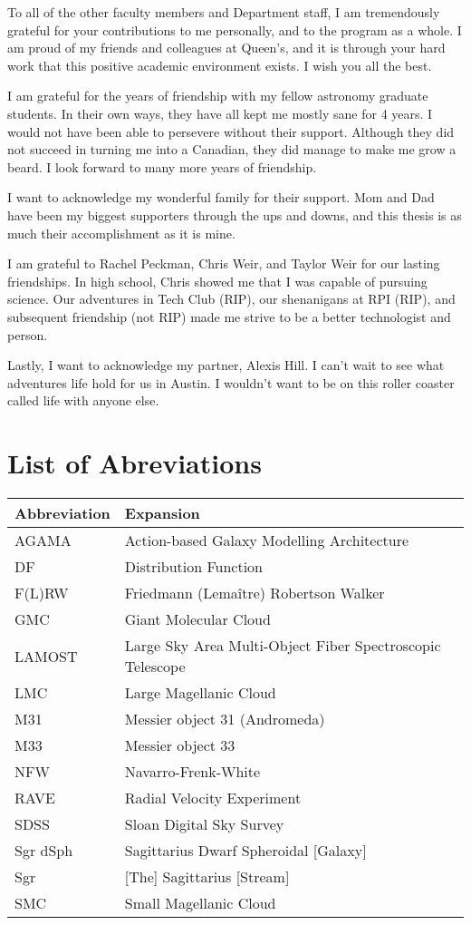 To all of the other faculty members and Department staff, I am tremendously grateful for your contributions to me personally, and to the program as a whole. I am proud of my friends and colleagues at Queen's, and it is through your hard work that this positive academic environment exists. I wish you all the best.

I am grateful for the years of friendship with my fellow astronomy graduate students. In their own ways, they have all kept me mostly sane for 4 years. I would not have been able to persevere without their support. Although they did not succeed in turning me into a Canadian, they did manage to make me grow a beard. I look forward to many more years of friendship.

I want to acknowledge my wonderful family for their support. Mom and Dad have been my biggest supporters through the ups and downs, and this thesis is as much their accomplishment as it is mine. 

I am grateful to Rachel Peckman, Chris Weir, and Taylor Weir for our lasting friendships. In high school, Chris showed me that I was capable of pursuing science. Our adventures in Tech Club (RIP), our shenanigans at RPI (RIP), and subsequent friendship (not RIP) made me strive to be a better technologist and person.

Lastly, I want to acknowledge my partner, Alexis Hill. I can't wait to see what adventures life hold for us in Austin. I wouldn't want to be on this roller coaster called life with anyone else.



\singlespacing \afterpreface \doublespacing

\chapter*{List of Abreviations}
\begin{longtable}{ll} 
\hline
Abbreviation & Expansion \\ \hline
\textsc{AGAMA} & Action-based Galaxy Modelling Architecture \\
DF & Distribution Function \\
F(L)RW & Friedmann (Lema\^itre) Robertson Walker\\
GMC    & Giant Molecular Cloud\\
LAMOST & Large Sky Area Multi-Object Fiber Spectroscopic Telescope \\
LMC & Large Magellanic Cloud\\
M31 & Messier object 31 (Andromeda) \\
M33 & Messier object 33\\
NFW & Navarro-Frenk-White\\
RAVE & Radial Velocity Experiment \\
SDSS & Sloan Digital Sky Survey\\
Sgr dSph & Sagittarius Dwarf Spheroidal [Galaxy]\\
Sgr  & [The] Sagittarius [Stream]\\ 
SMC  & Small Magellanic Cloud  \\ \hline
\end{longtable}

